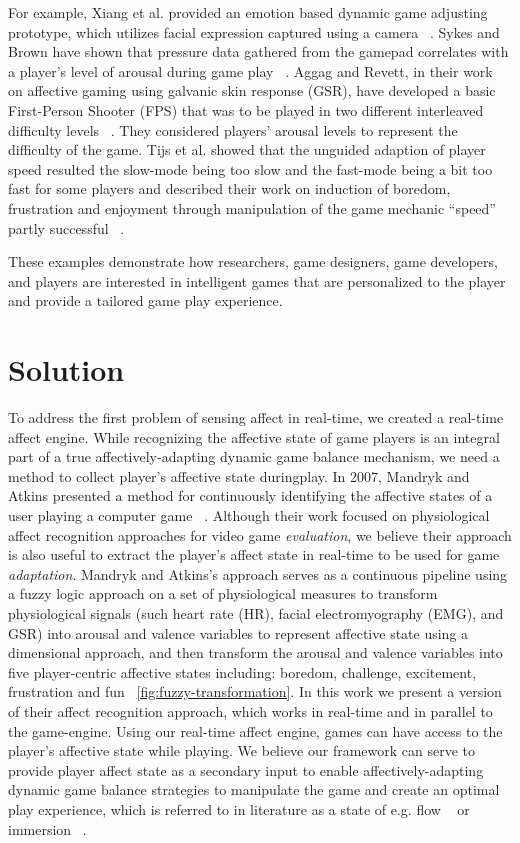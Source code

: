 For example, Xiang et al. provided an emotion based dynamic game adjusting prototype, which utilizes facial expression captured using a camera ~\cite{xiang2013dynamic}. Sykes and Brown have shown that pressure data gathered from the gamepad correlates with a player's level of arousal during game play ~\cite{sykes2003affective}. Aggag and Revett, in their work on affective gaming using galvanic skin response (GSR), have developed a basic First-Person Shooter (FPS) that was to be played in two different interleaved difficulty levels ~\cite{aggag2011affective}. They considered players' arousal levels to represent the difficulty of the game. Tijs et al. showed that the unguided adaption of player speed resulted the slow-mode being too slow and the fast-mode being a bit too fast for some players and described their work on induction of boredom, frustration and enjoyment through manipulation of the game mechanic “speed” partly successful ~\cite{tijs2009creating}.

These examples demonstrate how researchers, game designers, game developers, and players are interested in intelligent games that are personalized to the player and provide a tailored game play experience.

\section{Solution}
To address the first problem of sensing affect in real-time, we created a real-time affect engine. While recognizing the affective state of game players is an integral part of a true affectively-adapting dynamic game balance mechanism, we need a method to collect player's affective state duringplay. In 2007, Mandryk and Atkins presented a method for continuously identifying the affective states of a user playing a computer game ~\cite{mandryk2007fuzzy}. Although their work focused on physiological affect recognition approaches for video game \textit{evaluation}, we believe their approach is also useful to extract the player's affect state in real-time to be used for game \textit{adaptation}. Mandryk and Atkins's approach serves as a continuous pipeline using a fuzzy logic approach on a set of physiological measures to transform physiological signals (such heart rate (HR), facial electromyography (EMG), and GSR) into arousal and valence variables to represent affective state using a dimensional approach, and then transform the arousal and valence variables into five player-centric affective states including: boredom, challenge, excitement, frustration and fun ~\ref{fig:fuzzy-transformation}. In this work we present a version of their affect recognition approach, which works in real-time and in parallel to the game-engine. Using our real-time affect engine, games can have access to the player's affective state while playing. We believe our framework can serve to provide player affect state as a secondary input to enable affectively-adapting dynamic game balance strategies to manipulate the game and create an optimal play experience, which is referred to in literature as a state of e.g. flow ~\cite{chen2007flow} or immersion ~\cite{nacke2008flow}.

